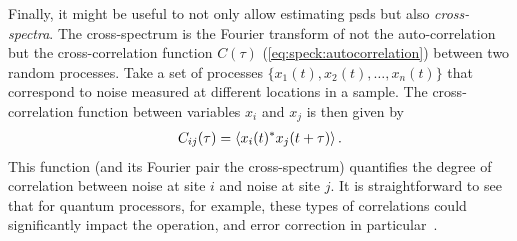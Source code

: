 Finally, it might be useful to not only allow estimating \glspl{psd} but also \emph{cross-spectra}.
The cross-spectrum is the Fourier transform of not the auto-correlation but the cross-correlation function $C(\tau)$ (\cf \cref{eq:speck:autocorrelation}) between two random processes.
Take a set of processes $\{x_1(t), x_2(t), \dotsc, x_n(t)\}$ that correspond to noise measured at different locations in a sample.
The cross-correlation function between variables $x_i$ and $x_j$ is then given by
\begin{align}\label{eq:speck:conclusion:crosscorrelation}
    C_{ij}(\tau) = \expval{x_i(t)\conjugate x_j(t + \tau)}.
\end{align}
This function (and its Fourier pair the cross-spectrum) quantifies the degree of correlation between noise at site $i$ and noise at site $j$.
It is straightforward to see that for quantum processors, for example, these types of correlations could significantly impact the operation, and error correction in particular~\cite{Aharonov2006,Nickerson2019,Clader2021}.
